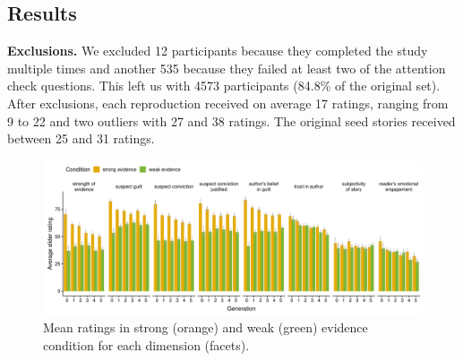 \documentclass[10pt,letterpaper]{article}
\newcommand{\jd}[1]{\textcolor{Green}{[jd: #1]}}
\begin{document}
\vspace{-.5cm}
\vspace{-.5cm}
\vspace{-.5cm}
\vspace{-.5cm}
\vspace{-.5cm}
\vspace{-.5cm}
\vspace{-.5cm}


\subsection{Results}

\textbf{Exclusions.} We excluded 12 participants because they completed the study multiple times and another 535 because they failed at least two of the attention check questions. This left us with 4573 participants (84.8\% of the original set). After exclusions, each reproduction received on average 17 ratings, ranging from 9 to 22 and two outliers with 27 and 38 ratings. %
The original seed stories received between 25 and 31 ratings.

\begin{figure}[]
	\includegraphics[width=\textwidth]{pics/subj_results_byquestion.pdf}
	\caption{Mean ratings in strong (orange) and weak (green) evidence condition for each dimension (facets).} 
	\label{fig:exp2results}
\end{figure}
\end{document}
